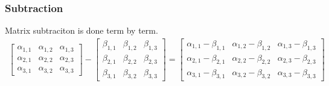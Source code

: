 \documentclass[12pt]{article}
\begin{document}
\subsubsection{Subtraction}
Matrix subtraciton is done term by term.
\begin{align}
	\left[\begin{array}{ccc}
		\alpha_{1,1} & \alpha_{1,2} & \alpha_{1,3}\\
		\alpha_{2,1} & \alpha_{2,2} & \alpha_{2,3}\\
		\alpha_{3,1} & \alpha_{3,2} & \alpha_{3,3}
	\end{array}\right]-\left[\begin{array}{ccc}
		\beta_{1,1} & \beta_{1,2} & \beta_{1,3}\\
		\beta_{2,1} & \beta_{2,2} & \beta_{2,3}\\
		\beta_{3,1} & \beta_{3,2} & \beta_{3,3}
	\end{array}\right]=\left[\begin{array}{ccc}
		\alpha_{1,1} - \beta_{1,1} & \alpha_{1,2} - \beta_{1,2} & \alpha_{1,3} - \beta_{1,3}\\
		\alpha_{2,1} - \beta_{2,1} & \alpha_{2,2} - \beta_{2,2} & \alpha_{2,3} - \beta_{2,3}\\
		\alpha_{3,1} - \beta_{3,1} & \alpha_{3,2} - \beta_{3,2} & \alpha_{3,3} - \beta_{3,3}
	\end{array}\right]
\end{align}
\end{document}
